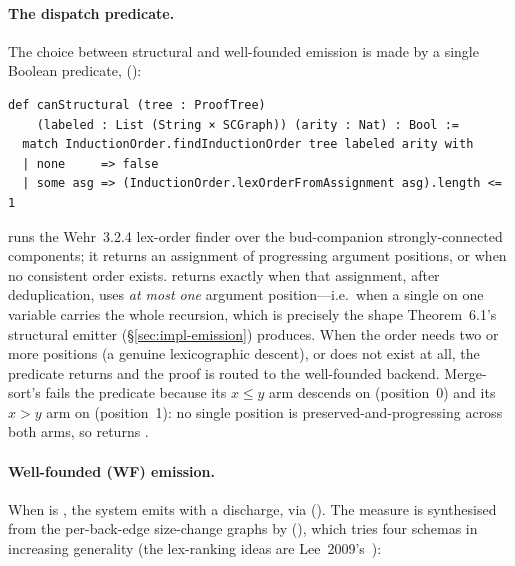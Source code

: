 \paragraph{The dispatch predicate.}
The choice between structural and well-founded emission is made by a
single Boolean predicate, 
():

\begin{lstlisting}
def canStructural (tree : ProofTree)
    (labeled : List (String × SCGraph)) (arity : Nat) : Bool :=
  match InductionOrder.findInductionOrder tree labeled arity with
  | none     => false
  | some asg => (InductionOrder.lexOrderFromAssignment asg).length <= 1
\end{lstlisting}

 runs the Wehr~3.2.4 lex-order finder over the
bud-companion strongly-connected components; it returns an assignment of
progressing argument positions, or  when no consistent order
exists.  returns  exactly when that
assignment, after deduplication, uses \emph{at most one} argument
position---i.e.\ when a single  on one variable carries the
whole recursion, which is precisely the shape Theorem~6.1's structural
emitter (§\ref{sec:impl-emission}) produces. When the order needs two or
more positions (a genuine lexicographic descent), or does not exist at all,
the predicate returns  and the proof is routed to the
well-founded backend. Merge-sort's  fails the predicate
because its \(x\le y\) arm descends on  (position~0) and its
\(x>y\) arm on  (position~1): no single position is
preserved-and-progressing across both arms, so 
returns .

\paragraph{Well-founded (WF) emission.}
When  is , the system emits
 with a
 discharge, via
 (). The measure is
synthesised from the per-back-edge size-change graphs by
 (), which tries four
schemas in increasing generality (the lex-ranking ideas are
Lee~2009's~\cite{lee2009ranking}):

